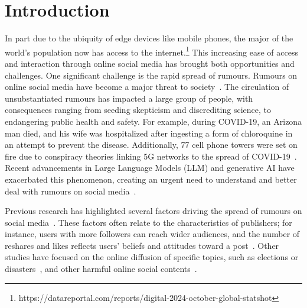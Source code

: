 \section{Introduction}

In part due to the ubiquity of edge devices like mobile phones, the major of the world's population now has access to the internet.\footnote{https://datareportal.com/reports/digital-2024-october-global-statshot} This increasing ease of access and interaction through online social media has brought both opportunities and challenges. One significant challenge is the rapid spread of rumours. Rumours on online social media have become a major threat to society~\citep{tian-etal-2022-duck,pheme2015,kochkina-etal-2018-one,ma-etal-2017-detect}. The circulation of unsubstantiated rumours has impacted a large group of people, with consequences ranging from seeding skepticism and discrediting science, to endangering public health and safety. For example, during COVID-19, an Arizona man died, and his wife was hospitalized after ingesting a form of chloroquine in an attempt to prevent the disease. Additionally, 77 cell phone towers were set on fire due to conspiracy theories linking 5G networks to the spread of COVID-19~\citep{coaid}. Recent advancements in Large Language Models (LLM) and generative AI have exacerbated this phenomenon, creating an urgent need to understand and better deal with rumours on social media~\citep{chen2024combatingmisinformation}. 

Previous research has highlighted several factors driving the spread of rumours on social media~\citep{emotion_dynamics}. These factors often relate to the characteristics of publishers; for instance, users with more followers can reach wider audiences, and the number of reshares and likes reflects users’ beliefs and attitudes toward a post~\citep{Zaman2013ABA, Vosoughi2018TheSO}. Other studies have focused on the online diffusion of specific topics, such as elections or disasters~\citep{Starbird2017ExaminingTA,DeDomenico2013TheAO}, and other harmful online social contents~\citep{Aleksandric2024UsersBA}.

